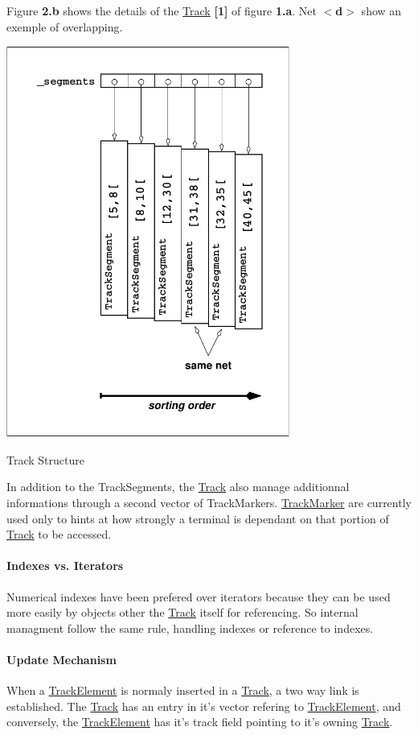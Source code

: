 Figure {\bfseries 2.\-b} shows the details of the \hyperlink{classKite_1_1Track}{Track} {\bfseries \mbox{[}1\mbox{]}} of figure {\bfseries 1.\-a}. Net {\bfseries $<$d$>$} show an exemple of overlapping.

 
\begin{DoxyImage}
\includegraphics[width=0.7\textwidth]{Track-1}
\caption{Track Structure}
\end{DoxyImage}


In addition to the Track\-Segments, the \hyperlink{classKite_1_1Track}{Track} also manage additionnal informations through a second vector of Track\-Markers. \hyperlink{classKite_1_1TrackMarker}{Track\-Marker} are currently used only to hints at how strongly a terminal is dependant on that portion of \hyperlink{classKite_1_1Track}{Track} to be accessed.\hypertarget{classKite_1_1Track_ssecTrackIndexes}{}\paragraph{Indexes vs. Iterators}\label{classKite_1_1Track_ssecTrackIndexes}
Numerical indexes have been prefered over iterators because they can be used more easily by objects other the \hyperlink{classKite_1_1Track}{Track} itself for referencing. So internal managment follow the same rule, handling indexes or reference to indexes.\hypertarget{classKite_1_1Track_ssecTrackUpdate}{}\paragraph{Update Mechanism}\label{classKite_1_1Track_ssecTrackUpdate}
When a \hyperlink{classKite_1_1TrackElement}{Track\-Element} is normaly inserted in a \hyperlink{classKite_1_1Track}{Track}, a two way link is established. The \hyperlink{classKite_1_1Track}{Track} has an entry in it's vector refering to \hyperlink{classKite_1_1TrackElement}{Track\-Element}, and conversely, the \hyperlink{classKite_1_1TrackElement}{Track\-Element} has it's {\ttfamily track} field pointing to it's owning \hyperlink{classKite_1_1Track}{Track}.

